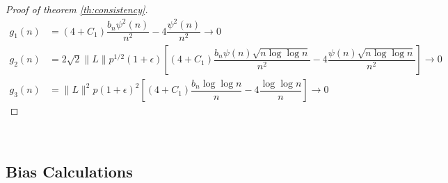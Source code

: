 \documentclass[12pt]{article}
\begin{document}
\begin{proof}[Proof of theorem \ref{th:consistency}]
\begin{align*}
    g_1(n) &= (4+C_1)\dfrac{b_n \psi^2(n)}{n^2} - 4\dfrac{\psi^2(n)}{n^2} \to 0\\
    g_2(n) &= 2\sqrt{2}\|L\|p^{1/2}(1+\epsilon)\left[(4+C_1)\dfrac{b_n\psi(n)\sqrt{n\log \log n}}{n^2} - 4\dfrac{\psi(n)\sqrt{n\log \log n}}{n^2}\right] \to 0\\
    g_3(n) &= \|L\|^2 p (1+\epsilon)^2\left[(4+C_1)\dfrac{b_n \log\log n}{n} - 4 \dfrac{\log \log n}{n}\right] \to 0
\end{align*}
\end{proof}

\\
\subsection{Bias Calculations} \label{appendix:bias}
\end{document}
